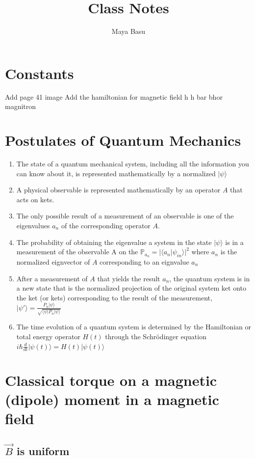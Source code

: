 \documentclass{homework}
\author{Maya Basu}
\title{Class Notes}
\newcommand{\kt}{\rangle}
\newcommand{\br}{\langle}
\begin{document}
 \maketitle
\section{Constants}
Add page 41 image
Add the hamiltonian for magnetic field
h
h bar
bhor magnitron

\section{Postulates of Quantum Mechanics}
\begin{enumerate}
    \item The state of a quantum mechanical system, including all the information you can know about it, is represented mathematically by a normalized $| \psi \kt$ 
    \item A physical observable is represented mathematically by an operator $A$ that acts on kets.
    \item The only possible result of a measurement of an observable is one of the eigenvalues $a_n$ of the corresponding operator $A$.
    \item The probability of obtaining the eigenvalue a system in the state $| \psi \kt$  is in a measurement of the observable A on the $\mathbb{P}_{a_n} = |\br a_n | \psi_{in} \kt |^2$ where $a_n$ is the normalized eignvector of $A$ corresponding to an eignvalue $a_n$
    \item After a measurement of $A$ that yields the result $a_n$, the quantum system is in a new state that is the normalized projection of the original system ket onto the ket (or kets) corresponding to the result of the measurement, $| \psi' \kt = \frac{P_n | \psi \kt}{\sqrt{ \br \psi | P_n | \psi \kt}}$
    \item The time evolution of a quantum system is determined by the Hamiltonian or total energy operator $H(t)$ through the Schrödinger equation $i\hbar \frac{d}{dt}| \psi (t) \kt = H(t)| \psi (t) \kt$


\end{enumerate}


\section{Classical torque on a magnetic (dipole) moment in a magnetic field}

\subsection{$\vec{B}$ is uniform}
\end{document}
